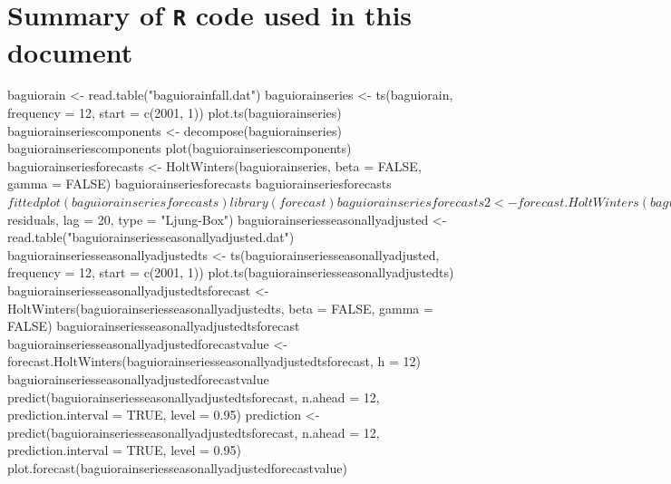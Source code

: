 \documentclass{article}\usepackage{graphicx, color}
\begin{document}
\section{Summary of \texttt{R} code used in this document}
\begin{listing}[!ht]
\begin{Schunk}
\begin{Sinput}
baguiorain <- read.table("baguiorainfall.dat")
baguiorainseries <- ts(baguiorain, frequency = 12, start = c(2001, 1))
plot.ts(baguiorainseries)
baguiorainseriescomponents <- decompose(baguiorainseries)
baguiorainseriescomponents
plot(baguiorainseriescomponents)
baguiorainseriesforecasts <- HoltWinters(baguiorainseries, beta = FALSE, gamma = FALSE)
baguiorainseriesforecasts
baguiorainseriesforecasts$fitted
plot(baguiorainseriesforecasts)
library(forecast)
baguiorainseriesforecasts2 <- forecast.HoltWinters(baguiorainseriesforecasts, 
    h = 12)
baguiorainseriesforecasts2
plot.forecast(baguiorainseriesforecasts2)
Box.test(baguiorainseriesforecasts2$residuals, lag = 20, type = "Ljung-Box")
baguiorainseriesseasonallyadjusted <- read.table("baguiorainseriesseasonallyadjusted.dat")
baguiorainseriesseasonallyadjustedts <- ts(baguiorainseriesseasonallyadjusted, 
    frequency = 12, start = c(2001, 1))
plot.ts(baguiorainseriesseasonallyadjustedts)
baguiorainseriesseasonallyadjustedtsforecast <- HoltWinters(baguiorainseriesseasonallyadjustedts, 
    beta = FALSE, gamma = FALSE)
baguiorainseriesseasonallyadjustedtsforecast
baguiorainseriesseasonallyadjustedforecastvalue <- forecast.HoltWinters(baguiorainseriesseasonallyadjustedtsforecast, 
    h = 12)
baguiorainseriesseasonallyadjustedforecastvalue
predict(baguiorainseriesseasonallyadjustedtsforecast, n.ahead = 12, prediction.interval = TRUE, 
    level = 0.95)
prediction <- predict(baguiorainseriesseasonallyadjustedtsforecast, n.ahead = 12, 
    prediction.interval = TRUE, level = 0.95)
plot.forecast(baguiorainseriesseasonallyadjustedforecastvalue)
\end{Sinput}
\end{Schunk}

\caption{\label{list:listingsummary} Summary of \texttt{R} codes used.}
\end{listing}
\end{document}
